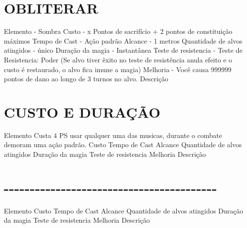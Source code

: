 \documentclass{article}%
\begin{document}
\section{OBLITERAR}%
\label{sec:OBLITERAR}%
Elemento {-}  Sombra\newline%
Custo {-}  x Pontos de sacrifício + 2 pontos de constituição máximos\newline%
Tempo de Cast {-}  Ação padrão\newline%
Alcance {-}  1 metros\newline%
Quantidade de alvos atingidos {-}  único\newline%
Duração da magia {-}  Instantânea\newline%
Teste de resistencia {-} Teste de Resistencia: Poder (Se alvo tiver êxito no teste de resistência anula efeito e o custo é restaurado, o alvo fica imune a magia)\newline%
Melhoria {-}  Você causa 999999 pontos de dano ao longo de 3 turnos no alvo.\newline%
Descrição \newline%

%
\section{CUSTO E DURAÇÃO}%
\label{sec:CUSTOEDURAO}%
Elemento Custa 4 PS usar qualquer uma das musicas, durante o combate demoram uma ação padrão.\newline%
Custo \newline%
Tempo de Cast \newline%
Alcance \newline%
Quantidade de alvos atingidos \newline%
Duração da magia \newline%
Teste de resistencia \newline%
Melhoria \newline%
Descrição \newline%

%
\section{{-}{-}{-}{-}{-}{-}{-}{-}{-}{-}{-}{-}{-}{-}{-}{-}{-}{-}{-}{-}{-}{-}{-}{-}{-}{-}{-}{-}{-}{-}{-}{-}{-}{-}{-}{-}{-}{-}{-}{-}{-}}%
\label{sec:{-}{-}{-}{-}{-}{-}{-}{-}{-}{-}{-}{-}{-}{-}{-}{-}{-}{-}{-}{-}{-}{-}{-}{-}{-}{-}{-}{-}{-}{-}{-}{-}{-}{-}{-}{-}{-}{-}{-}{-}{-}}%
Elemento \newline%
Custo \newline%
Tempo de Cast \newline%
Alcance \newline%
Quantidade de alvos atingidos \newline%
Duração da magia \newline%
Teste de resistencia \newline%
Melhoria \newline%
Descrição \newline%
\end{document}
